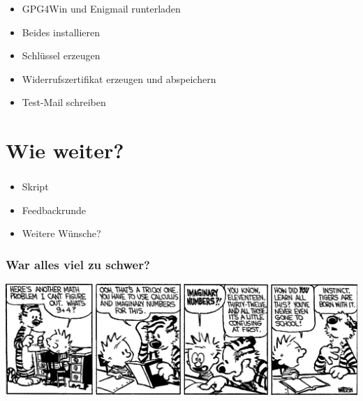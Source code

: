 \documentclass[compress]{beamer}
\begin{document}
\begin{frame}
  \frametitle{\insertsection}
  \begin{itemize}
  \item GPG4Win und Enigmail runterladen
  \item Beides installieren
  \item Schlüssel erzeugen
  \item Widerrufszertifikat erzeugen und abspeichern
  \item Test-Mail schreiben
  \end{itemize}
\end{frame}

\section{Wie weiter?}
\label{sec:weiter}

\begin{frame}
  \frametitle{\insertsection}
  \begin{itemize}
  \item Skript
  \item Feedbackrunde
  \item Weitere Wünsche?
  \end{itemize}
\end{frame}

\begin{frame}
  \frametitle{War alles viel zu schwer?}
  \includegraphics[width=1.05\columnwidth]{bilder/math4}
\end{frame}
\end{document}
